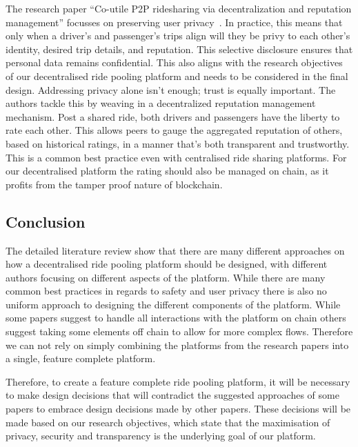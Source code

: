The research paper ``Co-utile P2P ridesharing via decentralization and reputation management'' focusses on preserving user privacy~\cite{Sanchez.2016}. In practice, this means that only when a driver's and passenger's trips align will they be privy to each other's identity, desired trip details, and reputation. This selective disclosure ensures that personal data remains confidential. This also aligns with the research objectives of our decentralised ride pooling platform and needs to be considered in the final design.
Addressing privacy alone isn't enough; trust is equally important. The authors tackle this by weaving in a decentralized reputation management mechanism. Post a shared ride, both drivers and passengers have the liberty to rate each other. This allows peers to gauge the aggregated reputation of others, based on historical ratings, in a manner that's both transparent and trustworthy. This is a common best practice even with centralised ride sharing platforms. For our decentralised platform the rating should also be managed on chain, as it profits from the tamper proof nature of blockchain.

\subsection{Conclusion}
The detailed literature review show that there are many different approaches on how a decentralised ride pooling platform should be designed, with different authors focusing on different aspects of the platform. While there are many common best practices in regards to safety and user privacy there is also no uniform approach to designing the different components of the platform. While some papers suggest to handle all interactions with the platform on chain others suggest taking some elements off chain to allow for more complex flows. Therefore we can not rely on simply combining the platforms from the research papers into a single, feature complete platform.

Therefore, to create a feature complete ride pooling platform, it will be necessary to make design decisions that will contradict the suggested approaches of some papers to embrace design decisions made by other papers. These decisions will be made based on our research objectives, which state that the maximisation of privacy, security and transparency is the underlying goal of our platform.


